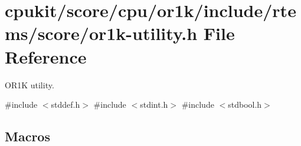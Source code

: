 \hypertarget{or1k-utility_8h}{}\section{cpukit/score/cpu/or1k/include/rtems/score/or1k-\/utility.h File Reference}
\label{or1k-utility_8h}


O\+R1K utility.  


{\ttfamily \#include $<$stddef.\+h$>$}\newline
{\ttfamily \#include $<$stdint.\+h$>$}\newline
{\ttfamily \#include $<$stdbool.\+h$>$}\newline
\subsection*{Macros}
